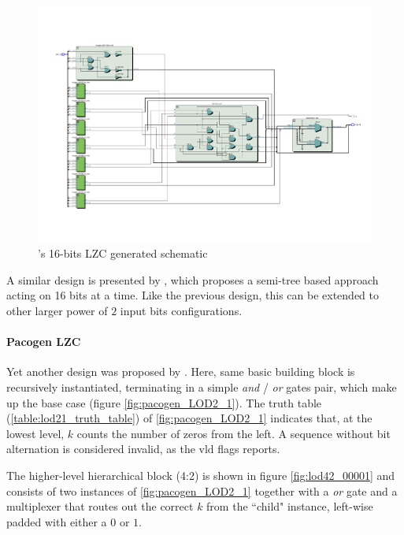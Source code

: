 \begin{figure}
    \centering
    \includegraphics[width=\textwidth]{figures/milenkovic_quartus2.pdf}
    \caption{\cite{milenkovic_modular_2015}'s 16-bits LZC generated schematic}
    \label{fig:milenkovic_lzc_quartus}
\end{figure}


A similar design is presented by \cite{dimitrakopoulos_low-power_2008}, which proposes a semi-tree based approach acting on 16 bits at a time. Like the previous design, this can be extended to other larger power of $2$ input bits configurations.

\paragraph{Pacogen LZC}

Yet another design was proposed by \cite{PACoGen}.
Here, same basic building block is recursively instantiated, terminating in a simple \textit{and} / \textit{or} gates pair, which make up the base case (figure \ref{fig:pacogen_LOD2_1}).
The truth table (\ref{table:lod21_truth_table}) of \ref{fig:pacogen_LOD2_1} indicates that, at the lowest level, $k$ counts the number of zeros from the left. A sequence without bit alternation is considered invalid, as the $\text{vld}$ flags reports.

The higher-level hierarchical block (4:2) is shown in figure \ref{fig:lod42_00001} and consists of two instances of \ref{fig:pacogen_LOD2_1} together with a \textit{or} gate and a multiplexer that routes out the correct $k$ from the ``child" instance, left-wise padded with either a $0$ or $1$.

